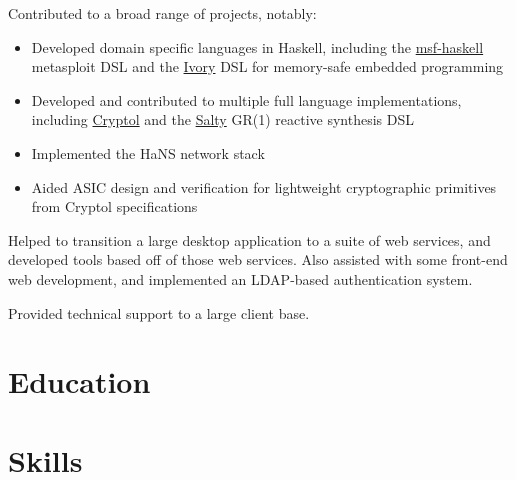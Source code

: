 \documentclass[letter,10pt]{moderncv}
\begin{document}
  {}{Contributed to a broad range of projects, notably:
  \begin{itemize}%
  \item Developed domain specific languages in Haskell, including the
    \href{https://github.com/galoisinc/msf-haskell}{msf-haskell} metasploit DSL
    and the \href{https://github.com/galoisinc/ivory}{Ivory} DSL for memory-safe
    embedded programming
  \item Developed and contributed to multiple full language implementations,
    including \href{https://github.com/galoisinc/cryptol}{Cryptol} and the
    \href{https://github.com/galoisinc/salty}{Salty} GR(1) reactive synthesis DSL
  \item Implemented the HaNS network stack
  \item Aided ASIC design and verification for lightweight cryptographic
    primitives from Cryptol specifications
  \end{itemize}}

  {}{Helped to transition a large desktop application to a suite of web
  services, and developed tools based off of those web services. Also assisted
  with some front-end web development, and implemented an LDAP-based
  authentication system.}

  {}{Provided technical support to a large client base.}

\section{Education}


\section{Skills}

\clearpage
\end{document}
